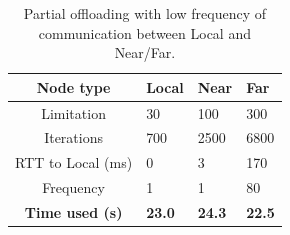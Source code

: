 \begin{table}[h!]
    \centering
    \begin{tabular}[c]{|c||p{2cm}|p{2cm}|p{2cm}|}
        \hline
        Node type & Local & Near & Far \\
        \hline
        Limitation          & 30 & 100 & 300  \\
        \hline
        Iterations          & 700 & 2500 & 6800 \\
        \hline
        RTT to Local (ms)   & 0 & 3 & 170 \\
        \hline
        Frequency           & 1 & 1 & 80 \\
        \hline
        \hline
        \hline
        \textbf{Time used (s)}       & \textbf{23.0} & \textbf{24.3} & \textbf{22.5} \\
        \hline
    \end{tabular}
    \caption{Partial offloading with low frequency of communication between Local and Near/Far.}
    \label{tab:Cloudlet_partial_offloading_low_frequency}
\end{table}




